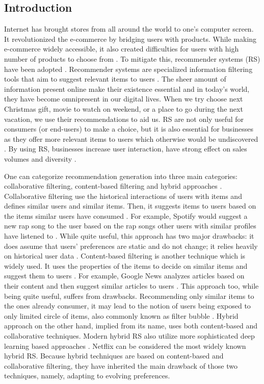 \documentclass[a4paper,12pt]{article}
\begin{document}
\subsection{Introduction}

Internet has brought stores from all around the world to one's computer screen. It revolutionized the e-commerce by bridging users with products. While making e-commerce widely accessible, it also created difficulties for users with high number of products to choose from \citep{ricci2011introduction}. To mitigate this, recommender systems (RS) have been adopted \citep{kotkovSurveySerendipityRecommender2016}. Recommender systems are specialized information filtering tools that aim to suggest relevant items to users \citep{adomavicius2005toward}. The sheer amount of information present online make their existence essential and in today's  world, they have become omnipresent in our digital lives. When we try choose next Christmas gift, movie to watch on weekend, or a place to go during the next vacation, we use their recommendations to aid us. RS are not only useful for consumers (or end-users) to make a choice, but it is also essential for businesses as they offer more relevant items to users which otherwise would be undiscovered \citep{ricci2011introduction}. By using RS, businesses increase user interaction, have strong effect on sales volumes and diversity \citep{songWhenHowDiversify2019}.

One can categorize recommendation generation into three main categories: collaborative filtering, content-based filtering and hybrid approaches \citep{burke2002hybrid}. Collaborative filtering use the historical interactions of users with items and defines similar users and similar items. Then, it suggests items to users based on the items similar users have consumed \citep{schafer1999recommender}. For example, Spotify would suggest a new rap song to the user based on the rap songs other users with similar profiles have listened to \citep{jacobson2016music}. While quite useful, this approach has two major drawbacks: it does assume that users' preferences are static and do not change; it relies heavily on historical user data \citep{wang2011collaborative}. Content-based filtering is another technique which is widely used. It uses the properties of the items to decide on similar items and suggest them to users \citep{pazzani2007content}. For example, Google News analyzes articles based on their content and then suggest similar articles to users \citep{das2007google}. This approach too, while being quite useful, suffers from drawbacks. Recommending only similar items to the ones already consumer, it may lead to the notion of users being exposed to only limited circle of items, also commonly known as filter bubble \citep{tintarevKnowingUnknownVisualising2018}. Hybrid approach on the other hand, implied from its name, uses both content-based and collaborative techniques. Modern hybrid RS also utilize more sophisticated deep learning based approaches \citep{bahrainian2020deep}. Netflix can be considered the most widely known hybrid RS. Because hybrid techniques are based on content-based and collaborative filtering, they have inherited the main drawback of those two techniques, namely, adapting to evolving preferences. 
\end{document}
